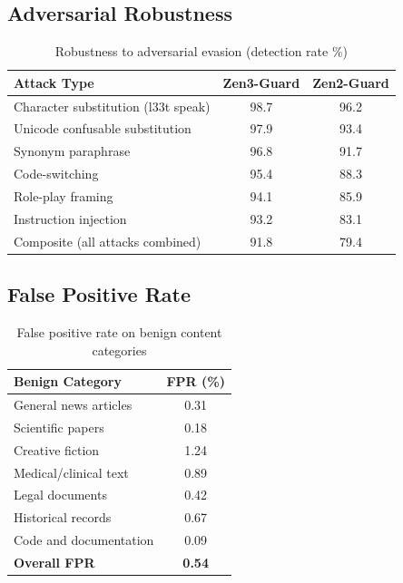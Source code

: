 \documentclass[11pt,a4paper]{article}
\begin{document}
\subsection{Adversarial Robustness}

\begin{table}[H]
\centering
\caption{Robustness to adversarial evasion (detection rate \%)}
\begin{tabular}{lcc}
\toprule
\textbf{Attack Type} & \textbf{Zen3-Guard} & \textbf{Zen2-Guard} \\
\midrule
Character substitution (l33t speak)   & 98.7 & 96.2 \\
Unicode confusable substitution       & 97.9 & 93.4 \\
Synonym paraphrase                    & 96.8 & 91.7 \\
Code-switching                        & 95.4 & 88.3 \\
Role-play framing                     & 94.1 & 85.9 \\
Instruction injection                 & 93.2 & 83.1 \\
Composite (all attacks combined)      & 91.8 & 79.4 \\
\bottomrule
\end{tabular}
\label{tab:adversarial}
\end{table}

\subsection{False Positive Rate}

\begin{table}[H]
\centering
\caption{False positive rate on benign content categories}
\begin{tabular}{lc}
\toprule
\textbf{Benign Category} & \textbf{FPR (\%)} \\
\midrule
General news articles     & 0.31 \\
Scientific papers         & 0.18 \\
Creative fiction          & 1.24 \\
Medical/clinical text     & 0.89 \\
Legal documents           & 0.42 \\
Historical records        & 0.67 \\
Code and documentation    & 0.09 \\
\textbf{Overall FPR}      & \textbf{0.54} \\
\bottomrule
\end{tabular}
\label{tab:fpr}
\end{table}
\end{document}
